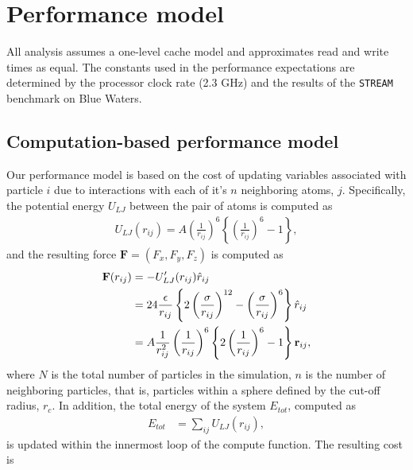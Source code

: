 \documentclass[12pt]{article}
\begin{document}
\section{Performance model}
All analysis assumes a one-level cache model and approximates read and write 
times as equal.  The constants used in the performance expectations are determined 
by the processor clock rate (2.3 GHz) and the results of the \texttt{STREAM} benchmark 
on Blue Waters. \\

\subsection{Computation-based performance model}
 Our performance model is based on the cost of updating variables associated
with particle $i$ due to interactions with each of it's $n$ neighboring atoms, $j$. Specifically,
the potential energy $U_{LJ}$ between the pair of atoms is computed as
\begin{align}
    U_{LJ}(r_{ij}) = A\left(\frac{1}{r_{ij}}\right)^{6}\left\{ \left(\frac{1}{r_{ij}}\right)^{6} - 1 \right\},           
\end{align}            
and the resulting force $\textbf{F} = (F_x, F_y, F_z)$ is computed as
\begin{align}
    \textbf{F}(r_{ij}) &= - U'_{LJ}(r_{ij})\hat{r}_{ij} \notag\\
        &= 24 \frac{\epsilon}{r_{ij}} \left\{ 2 \left(\frac{\sigma}{r_{ij}}\right)^{12}
              - \left(\frac{\sigma}{r_{ij}}\right)^6 \right\} \hat{r}_{ij} \notag\\
        &=  A \frac{1}{r_{ij}^2} \left(\frac{1}{r_{ij}}\right)^{6} \left\{ 2 \left(\frac{1}{r_{ij}}\right)^{6}
              - 1 \right\} \textbf{r}_{ij},
\end{align}
where $N$ is the total number of particles in the simulation, $n$ is the number of neighboring
particles, that is, particles within a sphere defined by the cut-off radius, $r_c$. In addition,
the total energy of the system $E_{tot}$, computed as
\begin{align}
    E_{tot} &= \sum_{ij} U_{LJ}(r_{ij}),
\end{align}
is updated within the innermost loop of the compute function. The resulting cost is
\end{document}
